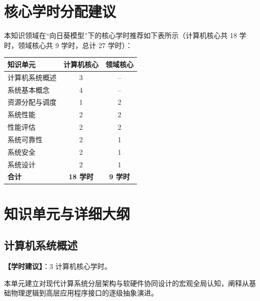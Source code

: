 \section{核心学时分配建议}

本知识领域在“向日葵模型”下的核心学时推荐如下表所示（计算机核心共 18 学时，领域核心共 9 学时，总计 27 学时）：

\begin{table}[H]
\centering
\setlength{\tabcolsep}{3.5pt}\fontsize{8pt}{9.6pt}\selectfont\begin{tabularx}{\columnwidth}{Y c c}
\toprule
\textbf{知识单元} & \textbf{计算机核心} & \textbf{领域核心} \\
\midrule
计算机系统概述 & 3 & -- \\
系统基本概念 & 4 & -- \\
资源分配与调度 & 1 & 2 \\
系统性能 & 2 & 2 \\
性能评估 & 2 & 2 \\
系统可靠性 & 2 & 1 \\
系统安全 & 2 & 1 \\
系统设计 & 2 & 1 \\
\midrule
\textbf{合计} & \textbf{18 学时} & \textbf{9 学时} \\
\bottomrule
\end{tabularx}
\end{table}

\section{知识单元与详细大纲}

\subsection{计算机系统概述}
\textbf{【学时建议】}：3 计算机核心学时。

本单元建立对现代计算系统分层架构与软硬件协同设计的宏观全局认知，阐释从基础物理逻辑到高层应用程序接口的逐级抽象演进。

